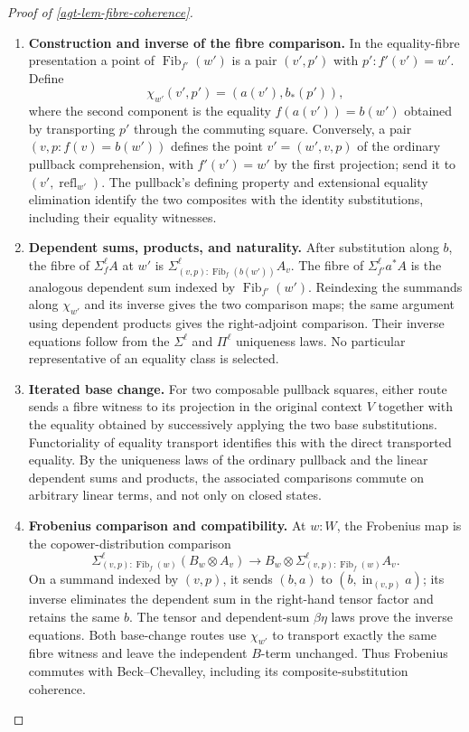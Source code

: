 \documentclass[11pt,a4paper]{article}
\numberwithin{equation}{section}
\theoremstyle{definition}
\theoremstyle{remark}
\theoremstyle{plain}
\begin{document}
\begin{proof}[Proof of \cref{agt-lem-fibre-coherence}]
\leavevmode
\begin{enumerate}[label=\textup{(\arabic*)},leftmargin=*,itemsep=4pt,topsep=3pt]
  \item \textbf{Construction and inverse of the fibre comparison.}
In the equality-fibre presentation a point of
$\operatorname{Fib}_{f'}(w')$ is a pair $(v',p')$ with
$p':f'(v')=w'$. Define
\[
 \chi_{w'}(v',p')=(a(v'),b_*(p')),
\]
where the second component is the equality
$f(a(v'))=b(w')$ obtained by transporting $p'$ through the
commuting square. Conversely, a pair
$(v,p:f(v)=b(w'))$ defines the point
$v'=(w',v,p)$ of the ordinary pullback comprehension, with
$f'(v')=w'$ by the first projection; send it to
$(v',\operatorname{refl}_{w'})$. The pullback's defining property
and extensional equality elimination identify the two composites
with the identity substitutions, including their equality witnesses.
  \item \textbf{Dependent sums, products, and naturality.} After
substitution along $b$, the fibre of $\Sigma_f^\ell A$ at $w'$ is
$\Sigma^\ell_{(v,p):\operatorname{Fib}_f(b(w'))}A_v$.
The fibre of $\Sigma_{f'}^\ell a^*A$ is the analogous dependent sum
indexed by $\operatorname{Fib}_{f'}(w')$. Reindexing the summands
along $\chi_{w'}$ and its inverse gives the two comparison maps;
the same argument using dependent products gives the right-adjoint
comparison. Their inverse equations follow from the $\Sigma^\ell$
and $\Pi^\ell$ uniqueness laws. No particular representative of an
equality class is selected.
  \item \textbf{Iterated base change.} For two composable pullback
squares, either route sends a fibre witness to its projection in the
original context $V$ together with the equality obtained by
successively applying the two base substitutions. Functoriality of
equality transport identifies this with the direct transported
equality. By the uniqueness laws of the ordinary pullback and the
linear dependent sums and products, the associated comparisons
commute on arbitrary linear terms, and not only on closed states.
  \item \textbf{Frobenius comparison and compatibility.} At $w:W$,
the Frobenius map is the copower-distribution comparison
\[
 \Sigma^\ell_{(v,p):\operatorname{Fib}_f(w)}
      (B_w\otimes A_v)
 \longrightarrow
 B_w\otimes
 \Sigma^\ell_{(v,p):\operatorname{Fib}_f(w)}A_v.
\]
On a summand indexed by $(v,p)$, it sends $(b,a)$ to
$(b,\operatorname{in}_{(v,p)}a)$; its inverse eliminates the
dependent sum in the right-hand tensor factor and retains the same
$b$. The tensor and dependent-sum $\beta\eta$ laws prove the inverse
equations. Both base-change routes use $\chi_{w'}$ to transport
exactly the same fibre witness and leave the independent $B$-term
unchanged. Thus Frobenius commutes with Beck--Chevalley, including
its composite-substitution coherence.
\end{enumerate}
\end{proof}
\end{document}
